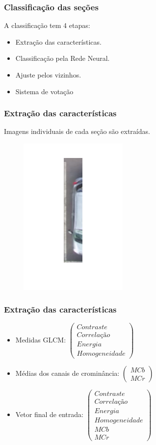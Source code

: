 \documentclass{beamer}
\begin{document}
\begin{frame}
\frametitle{Classificação das seções}
	A classificação tem 4 etapas:
   \begin{itemize}
      \item Extração das características.
      \item Classificação pela Rede Neural.
      \item Ajuste pelos vizinhos.
      \item Sistema de votação
    \end{itemize}
\end{frame}

\begin{frame}
\frametitle{Extração das características}
Imagens individuais de cada seção são extraídas.
\begin{figure}
	\centering
	\includegraphics[width=.4\textwidth]{imgSecao}
	\centering
\end{figure}
\end{frame}

\begin{frame}
\frametitle{Extração das características}
\begin{itemize}
\item Medidas GLCM: $\begin{pmatrix}
	Contraste\\Correlação\\Energia\\Homogeneidade
	\end{pmatrix}$
\item Médias dos canais de crominância: $\begin{pmatrix}
	MCb\\MCr
	\end{pmatrix}$
\item Vetor final de entrada: $\begin{pmatrix}
	Contraste\\Correlação\\Energia\\Homogeneidade\\MCb\\MCr
	\end{pmatrix}$
\end{itemize}

\end{frame}
\end{document}
